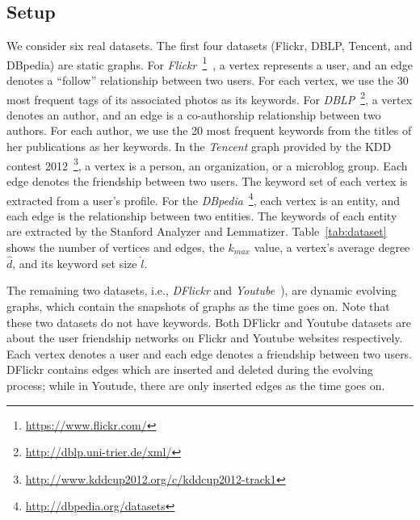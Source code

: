 \subsection{Setup}
\label{setup}

We consider six real datasets. The first four datasets (Flickr, DBLP, Tencent, and DBpedia) are static graphs.
For {\it Flickr}~\footnote{\url{https://www.flickr.com/}}~\cite{thomee2015new}, a vertex represents a user, and an edge denotes a ``follow'' relationship between two users. For each vertex, we use the 30 most frequent tags of its associated photos as its keywords.
For {\it DBLP}~\footnote{\url{http://dblp.uni-trier.de/xml/}}, a vertex denotes an author, and an edge is a co-authorship relationship between two authors.
For each author, we use the 20 most frequent keywords from the titles of her publications as her keywords.
In the {\it Tencent} graph provided by the KDD contest 2012~\footnote{\url{http://www.kddcup2012.org/c/kddcup2012-track1}}, a vertex is a person, an organization, or a microblog group. Each edge denotes the friendship between two users. The keyword set of each vertex is extracted from a user's profile. For the {\it DBpedia}~\footnote{\url{http://dbpedia.org/datasets}}, each vertex is an entity, and each edge is the relationship between two entities. The keywords of each entity are extracted by the Stanford Analyzer and Lemmatizer.
Table~\ref{tab:dataset} shows the number of vertices and edges, the $k_{max}$ value, a vertex's average degree $\widehat d$, and its keyword set size $\widehat l$.

{\color{blue}
The remaining two datasets,
i.e., {\it DFlickr} and {\it Youtube}~\cite{mislove-2009-socialnetworksthesis,mislove-2008-flickr}),
are dynamic evolving graphs, which contain the snapshots of graphs as the time goes on.
Note that these two datasets do not have keywords.
Both DFlickr and Youtube datasets are about the user friendship networks on Flickr and Youtube websites respectively.
Each vertex denotes a user and each edge denotes a friendship between two users.
DFlickr contains edges which are inserted and deleted during the evolving process;
while in Youtude, there are only inserted edges as the time goes on.
}

